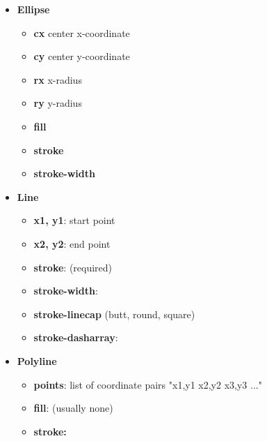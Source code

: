\documentclass{report}
\begin{document}
\begin{itemize}
            \begin{itemize}
                \item \textbf{cx}  center x-coordinate
                \item \textbf{cy}  center y-coordinate
                \item \textbf{r}  radius
                \item \textbf{fill}
                \item \textbf{stroke}
                \item \textbf{stroke-width}
            \end{itemize}
        \item \textbf{Ellipse}
            \begin{itemize}
                \item \textbf{cx}  center x-coordinate
                \item \textbf{cy}  center y-coordinate
                \item \textbf{rx}  x-radius
                \item \textbf{ry}  y-radius
                \item \textbf{fill}
                \item \textbf{stroke}
                \item \textbf{stroke-width}
            \end{itemize}
        \item \textbf{Line}
            \begin{itemize}
                \item \textbf{x1, y1}:  start point
                \item \textbf{x2, y2}:  end point
                \item \textbf{stroke}: (required)
                \item \textbf{stroke-width}:
                \item \textbf{stroke-linecap} (butt, round, square)
                \item \textbf{stroke-dasharray}:
            \end{itemize}
        \item \textbf{Polyline}
            \begin{itemize}
                \item \textbf{points}:  list of coordinate pairs "x1,y1 x2,y2 x3,y3 ..."
                \item \textbf{fill}: (usually none)
                \item \textbf{stroke:}

\end{itemize}
\end{itemize}
\end{document}
